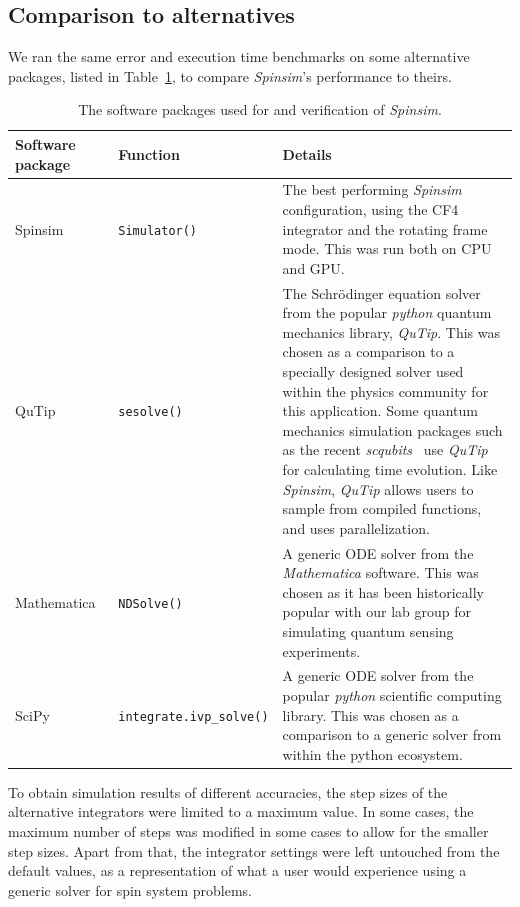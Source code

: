 \documentclass{jors}
\begin{document}
	\subsection{Comparison to alternatives}
		We ran the same error and execution time benchmarks on some alternative packages, listed in Table~\ref{tab:external}, to compare \emph{Spinsim}'s performance to theirs.
		\begin{table}[h!]
			\caption{The software packages used for and verification of \emph{Spinsim}.}
			\label{tab:external}
			\begin{tabular}{l|l|p{6.5cm}}
				\textbf{Software package}								&\textbf{Function}					&\textbf{Details}\\
				\hline
				Spinsim													&\texttt{Simulator()}				&The best performing \emph{Spinsim} configuration, using the CF4 integrator and the rotating frame mode. This was run both on CPU and GPU.
				\\
				\hline
				QuTip~\cite{johansson_qutip_2013}						&\texttt{sesolve()}					&The Schr\"odinger equation solver from the popular \emph{python} quantum mechanics library, \emph{QuTip}.
				This was chosen as a comparison to a specially designed solver used within the physics community for this application.
				Some quantum mechanics simulation packages such as the recent \emph{scqubits}~\cite{groszkowski_scqubits_2021} use \emph{QuTip} for calculating time evolution.
				Like \emph{Spinsim}, \emph{QuTip} allows users to sample from compiled functions, and uses parallelization.\\
				\hline
				Mathematica~\cite{wolfram_research_inc_mathematica_2020}	&\texttt{NDSolve()}					&A generic ODE solver from the \emph{Mathematica} software.
				This was chosen as it has been historically popular with our lab group for simulating quantum sensing experiments.\\
				\hline
				SciPy~\cite{virtanen_scipy_2020}							&\texttt{integrate.ivp\_solve()}	&A generic ODE solver from the popular \emph{python} scientific computing library.
				This was chosen as a comparison to a generic solver from within the python ecosystem.
			\end{tabular}
		\end{table}
		To obtain simulation results of different accuracies, the step sizes of the alternative integrators were limited to a maximum value.
		In some cases, the maximum number of steps was modified in some cases to allow for the smaller step sizes.
		Apart from that, the integrator settings were left untouched from the default values, as a representation of what a user would experience using a generic solver for spin system problems.
\end{document}
